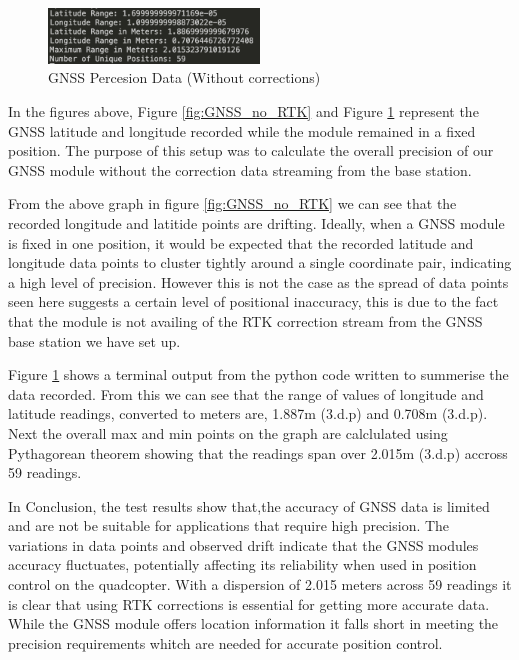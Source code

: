 \documentclass{report}
\begin{document}
\begin{figure}[H]
  \centering
  \includegraphics[width=0.5\textwidth]{Pictures/GNSS_data_no_correction.png}
  \caption{GNSS Percesion Data (Without corrections)}
  \label{fig:GNSS_data_no_RTK}
\end{figure}
In the figures above, Figure \ref{fig:GNSS_no_RTK} and
Figure \ref{fig:GNSS_data_no_RTK} represent the GNSS latitude and longitude
recorded while the module remained in a fixed position. The purpose of this
setup was to calculate the overall precision of our GNSS module without the
correction data streaming from the base station.

From the above graph in figure \ref{fig:GNSS_no_RTK} we can see that the
recorded longitude and latitide points are drifting. Ideally, when a GNSS module
is fixed in one position, it would be expected that the recorded latitude and
longitude data points to cluster tightly around a single coordinate pair,
indicating a high level of precision. However this is not the case as the spread
of data points seen here suggests a certain level of positional inaccuracy, this
is due to the fact that the module is not availing of the RTK correction stream
from the GNSS base station we have set up. 

Figure \ref{fig:GNSS_data_no_RTK} shows a terminal output from the python code
written to summerise the data recorded. From this we can see that the range of
values of longitude and latitude readings, converted to meters are, 1.887m
(3.d.p) and  0.708m (3.d.p). Next the overall max and min points on the graph
are calclulated using Pythagorean theorem showing that the readings span over
2.015m (3.d.p) accross 59 readings.

In Conclusion, the test results show that,the accuracy of GNSS data is limited
and are not be suitable for applications that require high precision. The
variations in data points and observed drift indicate that the GNSS modules
accuracy fluctuates, potentially affecting its reliability when used in position
control on the quadcopter. With a dispersion of 2.015 meters across 59 readings
it is clear that using RTK corrections is essential for getting more accurate
data. While the GNSS module offers location information it falls short in
meeting the precision requirements whitch are needed for accurate position
control.
\end{document}
